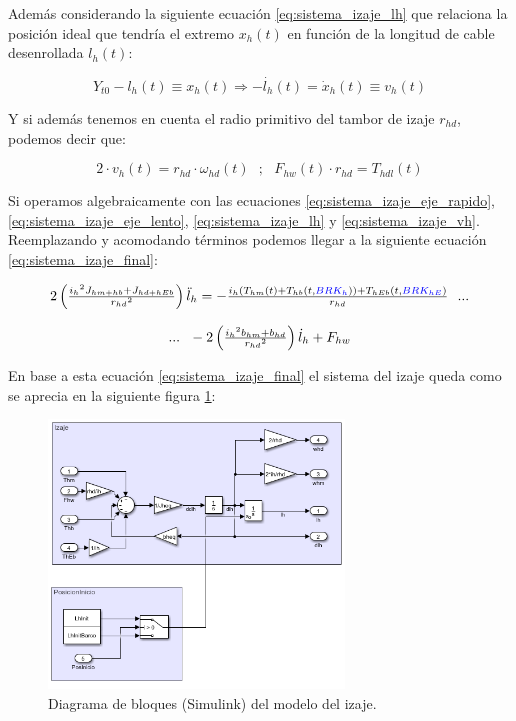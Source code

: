 \documentclass[11pt]{article}
\begin{document}
Además considerando la siguiente ecuación \ref{eq:sistema_izaje_lh} que relaciona la posición ideal que tendría el extremo $x_{h}(t)$ en función de la longitud de cable desenrollada $l_{h}(t)$:

\begin{equation}
	\label{eq:sistema_izaje_lh}
	Y_{t0}-l_{h}(t)\equiv x_{h}(t) \Rightarrow -\dot{l_{h}}(t)=\dot{x}_{h}(t)\equiv v_{h}(t)
\end{equation}

Y si además tenemos en cuenta el radio primitivo del tambor de izaje $r_{hd}$, podemos decir que:

\begin{equation}
	\label{eq:sistema_izaje_vh}
	2\cdot v_{h}(t)=r_{hd}\cdot \omega_{hd}(t)\ \ \ ;\ \ \ F_{hw}(t)\cdot r_{hd}=T_{hdl}(t)
\end{equation}

Si operamos algebraicamente con las ecuaciones \ref{eq:sistema_izaje_eje_rapido}, \ref{eq:sistema_izaje_eje_lento}, \ref{eq:sistema_izaje_lh} y \ref{eq:sistema_izaje_vh}. Reemplazando y acomodando términos podemos llegar a la siguiente ecuación \ref{eq:sistema_izaje_final}:

\begin{equation}
	\label{eq:sistema_izaje_final}
	\begin{matrix}
		2\left ( \frac{{i_{h}}^{2}J_{hm+hb}+J_{hd+hEb}}{{r_{hd}}^{2}} \right )\ddot{l}_{h}=-\frac{i_{h}\left ( T_{hm}(t)+T_{hb}(t,{\color{blue}BRK_{h}}) \right )+T_{hEb}(t,{\color{blue}BRK_{hE}})}{r_{hd}}\ \ ...
		\\
		\\
		...\ \ -2\left ( \frac{{i_{h}}^{2}b_{hm}+b_{hd}}{{r_{hd}}^{2}} \right )\dot{l}_{h}+F_{hw}
	\end{matrix}
\end{equation}

En base a esta ecuación \ref{eq:sistema_izaje_final} el sistema del izaje queda como se aprecia en la siguiente figura \ref{fig:sistema_izaje_simulink}:

\begin{figure}[h!]
	\centering
	\includegraphics[width=0.7\textwidth]{images/imagen_6_simulink_izaje.png}
	\caption{Diagrama de bloques (Simulink) del modelo del izaje.}
	\label{fig:sistema_izaje_simulink}
\end{figure}
\end{document}
